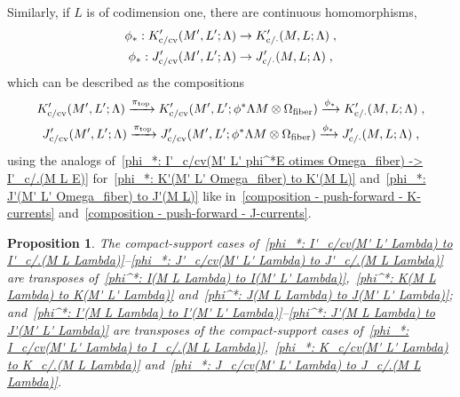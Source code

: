 \documentclass{memo-l}
\theoremstyle{plain}
\newtheorem{prop}[thm]{Proposition}
\theoremstyle{definition}
\theoremstyle{remark}
\newcommand{\fiber}{{\text{\rm fiber}}}
\newcommand{\topd}{{\text{\rm top}}}
\newcommand{\co}{{\text{\rm c}}}
\newcommand{\cv}{{\text{\rm cv}}}
\numberwithin{section}{chapter}
\numberwithin{equation}{section}%
\begin{document}
Similarly, if $L$ is of codimension one, there are continuous homomorphisms,
\begin{gather}
\phi_*:K'_{\co/\cv}(M',L';\Lambda)\to K'_{\co/{\cdot}}(M,L;\Lambda)\;,
\label{phi_*: K'_c/cv(M' L' Lambda) to K'_c/.(M L Lambda)}\\
\phi_*:J'_{\co/\cv}(M',L';\Lambda)\to J'_{\co/{\cdot}}(M,L;\Lambda)\;,
\label{phi_*: J'_c/cv(M' L' Lambda) to J'_c/.(M L Lambda)}
\end{gather}
which can be described as the compositions
\begin{gather*}
K'_{\co/\cv}(M',L';\Lambda)\xrightarrow{\pi_\topd}K'_{\co/\cv}(M',L';\phi^*\Lambda M\otimes\Omega_\fiber)
\xrightarrow{\phi_*}K'_{\co/{\cdot}}(M,L;\Lambda)\;,\\
J'_{\co/\cv}(M',L';\Lambda)\xrightarrow{\pi_\topd}J'_{\co/\cv}(M',L';\phi^*\Lambda M\otimes\Omega_\fiber)
\xrightarrow{\phi_*}J'_{\co/{\cdot}}(M,L;\Lambda)\;,
\end{gather*}
using the analogs of~\eqref{phi_*: I'_c/cv(M' L' phi^*E otimes Omega_fiber) -> I'_c/.(M L E)} for~\eqref{phi_*: K'(M' L' Omega_fiber) to K'(M L)} and~\eqref{phi_*: J'(M' L' Omega_fiber) to J'(M L)} like in~\eqref{composition - push-forward - K-currents} and~\eqref{composition - push-forward - J-currents}.

\begin{prop}\label{p: phi_* is transpose of phi^* - I-currents - I'-currents}
The compact-support cases of~\eqref{phi_*: I'_c/cv(M' L' Lambda) to I'_c/.(M L Lambda)}--\eqref{phi_*: J'_c/cv(M' L' Lambda) to J'_c/.(M L Lambda)} are transposes of~\eqref{phi^*: I(M L Lambda) to I(M' L' Lambda)},~\eqref{phi^*: K(M L Lambda) to K(M' L' Lambda)} and~\eqref{phi^*: J(M L Lambda) to J(M' L' Lambda)}; and~\eqref{phi^*: I'(M L Lambda) to I'(M' L' Lambda)}--\eqref{phi^*: J'(M L Lambda) to J'(M' L' Lambda)} are transposes of the compact-support cases of~\eqref{phi_*: I_c/cv(M' L' Lambda) to I_c/.(M L Lambda)},~\eqref{phi_*: K_c/cv(M' L' Lambda) to K_c/.(M L Lambda)} and~\eqref{phi_*: J_c/cv(M' L' Lambda) to J_c/.(M L Lambda)}.
\end{prop}
\end{document}
